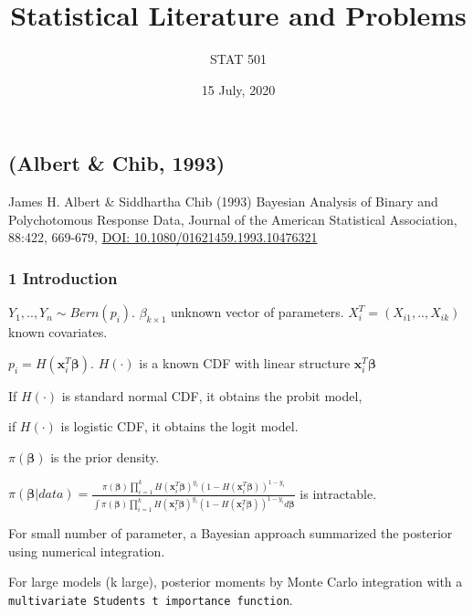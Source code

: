 \documentclass[
]{article}
\title{Statistical Literature and Problems}
\subtitle{STAT 501}
\author{}
\date{\vspace{-2.5em}15 July, 2020}
\begin{document}
\maketitle

\hypertarget{section}{%
\section{}\label{section}}

\hypertarget{albert-chib-1993}{%
\subsection{(Albert \& Chib, 1993)}\label{albert-chib-1993}}

James H. Albert \& Siddhartha Chib (1993) Bayesian Analysis of Binary
and Polychotomous Response Data, Journal of the American Statistical
Association, 88:422, 669-679,
\href{https://doi.org/10.1080/01621459.1993.10476321}{DOI:
10.1080/01621459.1993.10476321}

\hypertarget{introduction}{%
\subsubsection{1 Introduction}\label{introduction}}

\(Y_1,..,Y_n\sim Bern(p_i)\). \(\beta_{k\times1}\) unknown vector of
parameters. \(X_i^T=(X_{i1},..,X_{ik})\) known covariates.

\(p_i=H(\mathbf{x}_i^T\boldsymbol{\beta})\). \(H(\cdot)\) is a known CDF
with linear structure \(\mathbf{x}_i^T\boldsymbol{\beta}\)

If \(H(\cdot)\) is standard normal CDF, it obtains the probit model,

if \(H(\cdot)\) is logistic CDF, it obtains the logit model.

\(\pi(\boldsymbol{\beta})\) is the prior density.

\(\pi(\boldsymbol{\beta}|data) = \frac{\pi(\boldsymbol{\beta})\prod_{i=1}^{k}H (\mathbf{x}_i^T\boldsymbol{\beta})^{y_i}(1-H(\mathbf{x}_i^T\boldsymbol{\beta}))^{1-y_i}}{\int\pi(\boldsymbol{\beta})\prod_{i=1}^{k}H (\mathbf{x}_i^T\boldsymbol{\beta})^{y_i}(1-H(\mathbf{x}_i^T\boldsymbol{\beta}))^{1-y_i}d\boldsymbol{\beta}}\)
is intractable.

For small number of parameter, a Bayesian approach summarized the
posterior using numerical integration.

For large models (k large), posterior moments by Monte Carlo integration
with a
\texttt{multivariate\ Student\textquotesingle{}s\ t\ importance\ function}.
\end{document}
